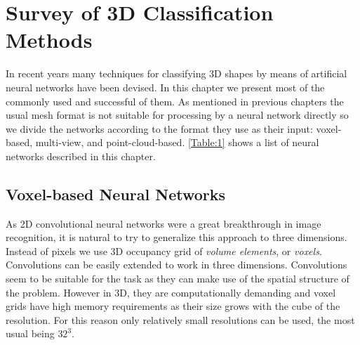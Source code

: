 \chapter{Survey of 3D Classification Methods}
\label{sec:chap3}
In recent years many techniques for classifying 3D shapes by means of artificial neural networks have been devised. In this chapter we present most of the commonly used and successful of them. As mentioned in previous chapters the usual mesh format is not suitable for processing by a neural network directly so we divide the networks according to the format they use as their input: voxel-based, multi-view, and point-cloud-based. \autoref{Table:1} shows a list of neural networks described in this chapter.



\section{Voxel-based Neural Networks}
As 2D convolutional neural networks were a great breakthrough in image recognition, it is natural to try to generalize this approach to three dimensions. Instead of pixels we use 3D occupancy grid of \textit{volume elements}, or \textit{voxels}. Convolutions can be easily extended to work in three dimensions. Convolutions seem to be suitable for the task as they can make use of the spatial structure of the problem. However in 3D, they are computationally demanding and voxel grids have high memory requirements as their size grows with the cube of the resolution. For this reason only relatively small resolutions can be used, the most usual being $32^3$. 

